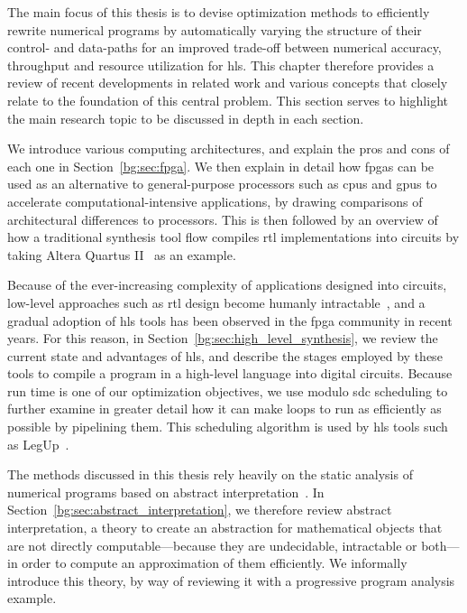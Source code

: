 The main focus of this thesis is to devise optimization methods to efficiently
rewrite numerical programs by automatically varying the structure of their
control- and data-paths for an improved trade-off between numerical accuracy,
throughput and resource utilization for \gls{hls}\@.  This chapter therefore
provides a review of recent developments in related work and various concepts
that closely relate to the foundation of this central problem.  This section
serves to highlight the main research topic to be discussed in depth in each
section.

We introduce various computing architectures, and explain the pros and cons
of each one in Section~\ref{bg:sec:fpga}.  We then explain in detail how
\glspl{fpga} can be used as an alternative to general-purpose processors
such as \glspl{cpu} and \glspl{gpu} to accelerate computational-intensive
applications, by drawing comparisons of architectural differences to
processors.  This is then followed by an overview of how a traditional
synthesis tool flow compiles \gls{rtl} implementations into circuits by taking
Altera Quartus II~\cite{quartus} as an example.

Because of the ever-increasing complexity of applications designed into
circuits, low-level approaches such as \gls{rtl} design become humanly
intractable~\cite{gajski}, and a gradual adoption of \gls{hls} tools has been
observed in the \gls{fpga} community in recent years.  For this reason, in
Section~\ref{bg:sec:high_level_synthesis}, we review the current state and
advantages of \gls{hls}, and describe the stages employed by these tools to
compile a program in a high-level language into digital circuits.  Because
run time is one of our optimization objectives, we use modulo \gls{sdc}
scheduling to further examine in greater detail how it can make loops to run as
efficiently as possible by pipelining them.  This scheduling algorithm is used
by \gls{hls} tools such as LegUp~\cite{legup}.

The methods discussed in this thesis rely heavily on the static analysis of
numerical programs based on abstract interpretation~\cite{cousot77}.  In
Section~\ref{bg:sec:abstract_interpretation}, we therefore review abstract
interpretation, a theory to create an abstraction for mathematical objects that
are not directly computable---because they are undecidable, intractable or
both---in order to compute an approximation of them efficiently.  We informally
introduce this theory, by way of reviewing it with a progressive program
analysis example.

